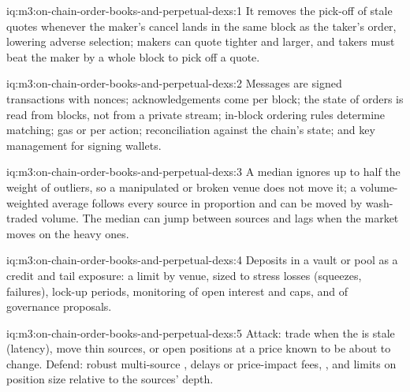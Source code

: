 \begin{solution}{iq:m3:on-chain-order-books-and-perpetual-dexs:1}
It removes the pick-off of stale quotes whenever the maker's cancel lands in the same block as the taker's order, lowering adverse selection;
makers can quote tighter and larger, and takers must beat the maker by a whole block to pick off a quote.
\end{solution}

\begin{solution}{iq:m3:on-chain-order-books-and-perpetual-dexs:2}
Messages are signed transactions with nonces; acknowledgements come per block; the state of orders is read from blocks, not from a private
stream; in-block ordering rules determine matching; gas or  per action; reconciliation against the chain's state; and key
management for signing wallets.
\end{solution}

\begin{solution}{iq:m3:on-chain-order-books-and-perpetual-dexs:3}
A median ignores up to half the weight of outliers, so a manipulated or broken venue does not move it; a volume-weighted average follows every
source in proportion and can be moved by wash-traded volume. The median can jump between sources and lags when the market moves on the heavy
ones.
\end{solution}

\begin{solution}{iq:m3:on-chain-order-books-and-perpetual-dexs:4}
Deposits in a vault or pool as a credit and tail exposure: a limit by venue, sized to stress losses (squeezes,  failures), lock-up periods,
monitoring of open interest and caps, and of governance proposals.
\end{solution}

\begin{solution}{iq:m3:on-chain-order-books-and-perpetual-dexs:5}
Attack: trade when the  is stale (latency), move thin  sources, or open positions at a price known to be about to change. Defend:
robust multi-source , delays or price-impact fees, , and limits on position size relative to the sources' depth.
\end{solution}

